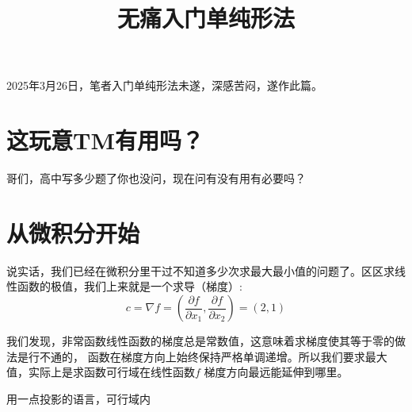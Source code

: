 \documentclass{article}
\title{无痛入门单纯形法}
\author{}
\begin{document}
\maketitle

2025年3月26日，笔者入门单纯形法未遂，深感苦闷，遂作此篇。

\section{这玩意TM有用吗？}
哥们，高中写多少题了你也没问，现在问有没有用有必要吗？

\section{从微积分开始}

说实话，我们已经在微积分里干过不知道多少次求最大最小值的问题了。区区求线性函数的极值，我们上来就是一个求导（梯度）:
\[
    c = \nabla f =\left( \frac{\partial f}{\partial x_1},
    \frac{\partial f}{\partial x_2} \right) = (2,1)
\]

我们发现，非常函数线性函数的梯度总是常数值，这意味着求梯度使其等于零的做法是行不通的，
函数在梯度方向上始终保持严格单调递增。所以我们要求最大值，实际上是求函数可行域在线性函数\(f\) 梯度方向最远能延伸到哪里。

用一点投影的语言，可行域内
\end{document}
